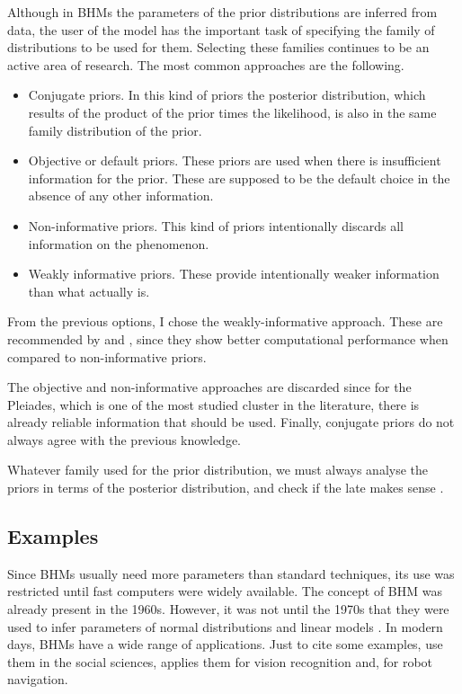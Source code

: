 {\color{red}
Although in BHMs the parameters of the prior distributions are inferred from data, the user of the model has the important task of specifying the family of distributions to be used for them. Selecting these families continues to be an active area of research. The most common approaches are the following.

\begin{itemize}
\item Conjugate priors. In this kind of priors the posterior distribution, which results of the product of the prior times the likelihood, is also in the same family distribution of the prior. 

\item Objective or default priors. These priors are used when there is insufficient information  for the prior. These are supposed to be the default choice in the absence of any other information.

\item Non-informative priors. This kind of priors intentionally discards all information on the phenomenon.

\item Weakly informative priors. These provide intentionally weaker information than what actually is. 
\end{itemize}

From the previous options, I chose the weakly-informative approach. These are recommended by \citet{Gelman2006,Gelman2008,Huang2013} and \citet{Chung2015}, since they show better computational performance when compared to non-informative priors.

The objective and non-informative approaches are discarded since for the Pleiades, which is one of the most studied cluster in the literature, there is already reliable information that should be used. Finally, conjugate priors do not always agree with the previous knowledge. 

Whatever family used for the prior distribution, we must always analyse the priors in terms of the posterior distribution, and check if the late makes sense \cite[][ Chap. 6]{Gelman2006,Gelman2013}.
}

\subsection{Examples}
Since BHMs usually need more parameters than standard techniques, its use was restricted until fast computers were widely available. The concept of BHM was already present in the 1960s. However, it was not until  the 1970s that they were used to infer parameters of normal distributions and linear models \cite[see][for an historical perspective of BHMs]{Good1980}. In modern days, BHMs have a wide range of applications. Just to cite some examples, \citet{Gelman2007} use them in the social sciences, \citet{Fei2005} applies them for vision recognition and, \citet{Diard2008} for robot navigation.

